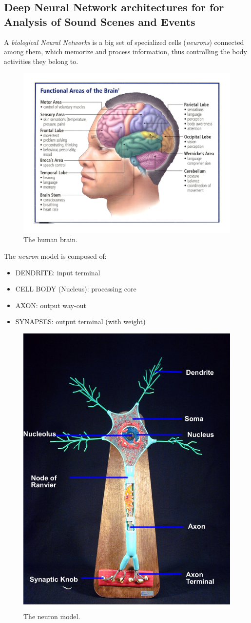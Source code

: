 \subsection{Deep Neural Network architectures for for Analysis of Sound Scenes and Events}


A \textit{biological Neural Networks} is a big set of specialized cells (\textit{neurons}) connected among them, which memorize and process information, thus controlling the body activities they belong to.

\begin{figure}[t]
\centering
\includegraphics[width=0.65\linewidth]{img/Brain}
\caption{The human brain.}
\end{figure}

The \textit{neuron} model is composed of:
\begin{itemize}
\item DENDRITE: input terminal
\item CELL BODY (Nucleus): processing core
\item AXON: output way-out
\item SYNAPSES: output terminal (with weight)
\end{itemize}


\begin{figure}[t]
\centering
\includegraphics[width=0.4\linewidth]{img/neuron_model}
\caption{The neuron model.}
\end{figure}


